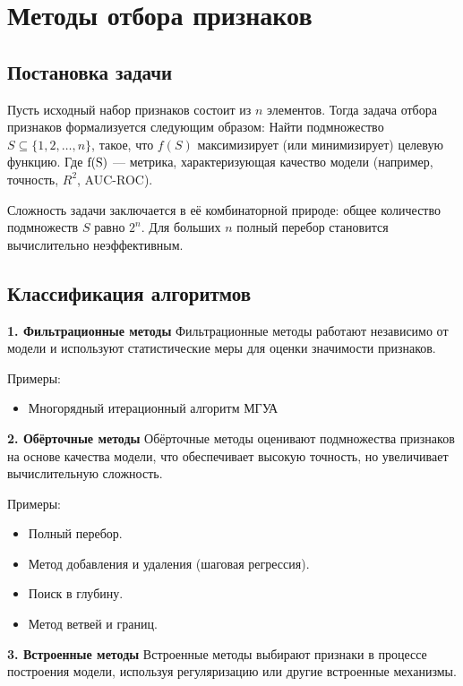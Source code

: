 \section{Методы отбора признаков}


\subsection*{Постановка задачи}
Пусть исходный набор признаков состоит из \( n \) элементов. Тогда задача отбора признаков формализуется следующим образом: 
Найти подмножество $S \subseteq \{1, 2, \dots, n\}$, такое, что $f(S)$ максимизирует (или минимизирует) целевую функцию. Где \( $f(S)$ \) — метрика, характеризующая качество модели (например, точность, $ R^2 $, AUC-ROC).

Сложность задачи заключается в её комбинаторной природе: общее количество подмножеств \( S \) равно \( 2^n \). Для больших \( n \) полный перебор становится вычислительно неэффективным.

\subsection*{Классификация алгоритмов}

\textbf{1. Фильтрационные методы}
Фильтрационные методы работают независимо от модели и используют статистические меры для оценки значимости признаков.

Примеры:
\begin{itemize}
    \item Многорядный итерационный алгоритм МГУА 
\end{itemize}

\textbf{2. Обёрточные методы}
Обёрточные методы оценивают подмножества признаков на основе качества модели, что обеспечивает высокую точность, но увеличивает вычислительную сложность.  

Примеры:
\begin{itemize}
    \item Полный перебор.
    \item Метод добавления и удаления (шаговая регрессия).
    \item Поиск в глубину.
    \item Метод ветвей и границ.
\end{itemize}

\textbf{3. Встроенные методы}
Встроенные методы выбирают признаки в процессе построения модели, используя регуляризацию или другие встроенные механизмы.  


